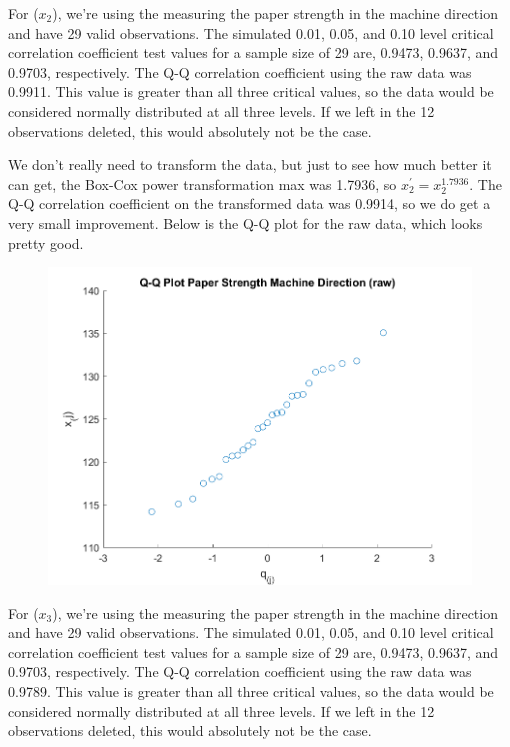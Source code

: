 For ($x_{2}$), we're using the measuring the paper strength in the machine direction and have 29 valid observations. The simulated 0.01, 0.05, and 0.10 level critical correlation coefficient test values for a sample size of 29 are, 0.9473, 0.9637, and 0.9703, respectively. The Q-Q correlation coefficient using the raw data was 0.9911. This value is greater than all three critical values, so the data would be considered normally distributed at all three levels. If we left in the 12 observations deleted, this would absolutely not be the case.

We don't really need to transform the data, but just to see how much better it can get, the Box-Cox power transformation max was 1.7936, so $x_{2}^{\prime} = x_{2}^{1.7936}$. The Q-Q correlation coefficient on the transformed data was 0.9914, so we do get a very small improvement. Below is the Q-Q plot for the raw data, which looks pretty good.

\begin{center}
    \begin{figure}[H]
        \centering
        \includegraphics[scale=0.6]{./matlab/chapter-4/sol4.35.qq.2.png}
    \end{figure}
\end{center}

For ($x_{3}$), we're using the measuring the paper strength in the machine direction and have 29 valid observations. The simulated 0.01, 0.05, and 0.10 level critical correlation coefficient test values for a sample size of 29 are, 0.9473, 0.9637, and 0.9703, respectively. The Q-Q correlation coefficient using the raw data was 0.9789. This value is greater than all three critical values, so the data would be considered normally distributed at all three levels. If we left in the 12 observations deleted, this would absolutely not be the case.

